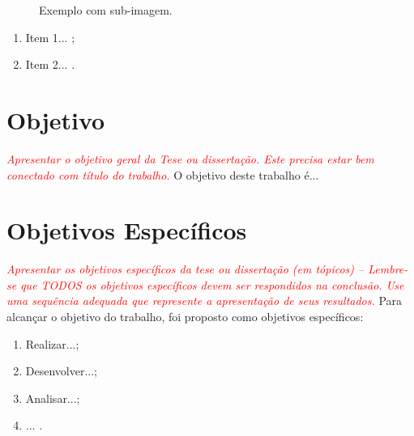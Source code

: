 \begin{figure}[!h]
    \caption{Exemplo com sub-imagem.}
    \centering
    \label{fig:fig_exemplo_subimagem}
\end{figure}

\lipsum[2-2]

\begin{enumerate}
    \item Item 1... ;
    \item Item 2... .
\end{enumerate}

\lipsum[3-3]

\section{Objetivo}
\label{section:objetivo}

\textit{\textcolor{red}{Apresentar o objetivo geral da Tese ou dissertação. Este precisa estar bem conectado com título do trabalho.}} O objetivo deste trabalho é...

\section{Objetivos Específicos}
\textit{\textcolor{red}{Apresentar os objetivos específicos da tese ou dissertação (em tópicos) – Lembre-se que TODOS os objetivos específicos devem ser respondidos na conclusão. Use uma sequência adequada que represente a apresentação de seus resultados.}}
Para alcançar o objetivo do trabalho, foi proposto como objetivos específicos:
\begin{enumerate}
    \item Realizar...;
    \item Desenvolver...;
    \item Analisar...;
    \item ... .
\end{enumerate}

